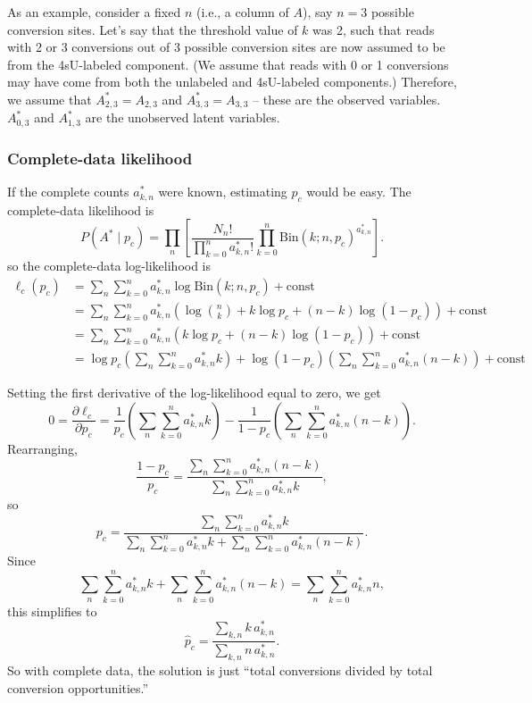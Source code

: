 \documentclass[11pt]{article}
\begin{document}
As an example, consider a fixed $n$ (i.e., a column of $A$), say $n = 3$ possible conversion sites. Let's say that the threshold value of $k$ was 2, such that reads with 2 or 3 conversions out of 3 possible conversion sites are now assumed to be from the 4sU-labeled component. (We assume that reads with 0 or 1 conversions may have come from both the unlabeled and 4sU-labeled components.) Therefore, we assume that $A^*_{2,3} = A_{2,3}$ and $A^*_{3,3} = A_{3,3}$ -- these are the observed variables. $A^*_{0, 3}$ and $A^*_{1,3}$ are the unobserved latent variables.

\subsubsection{Complete-data likelihood}

If the complete counts $a^*_{k,n}$ were known, estimating $p_c$ would be easy. The complete-data likelihood is
\[
P(A^* \mid p_c)
=
\prod_n
\left[
\frac{N_n!}{\prod_{k=0}^n a^*_{k,n}!}
\prod_{k=0}^n \mathrm{Bin}(k;n,p_c)^{a^*_{k,n}}
\right].
\]
so the complete-data log-likelihood is
\[
\begin{aligned}
\ell_c(p_c)
&=
\sum_n\sum_{k=0}^n a^*_{k,n}\log \mathrm{Bin}(k;n,p_c)+\text{const} \\
&= \sum_n\sum_{k=0}^n a^*_{k,n} \left(\log\binom{n}{k}+k\log p_c +(n-k)\log(1-p_c) \right) + \text{const} \\
&= \sum_n\sum_{k=0}^n a^*_{k,n} \left(k\log p_c +(n-k)\log(1-p_c) \right) + \text{const} \\
&= \log p_c \left(\sum_n \sum_{k=0}^n a^*_{k,n} k \right) + \log(1-p_c) \left( \sum_n\sum_{k=0}^n a^*_{k,n} (n-k) \right) + \text{const} 
\end{aligned}
\]

Setting the first derivative of the log-likelihood equal to zero, we get
\[
0
= \frac{\partial \ell_c}{\partial p_c}
= \frac{1}{p_c} \left(\sum_n \sum_{k=0}^n a^*_{k,n} k \right)
- \frac{1}{1-p_c} \left( \sum_n\sum_{k=0}^n a^*_{k,n} (n-k) \right).
\]
Rearranging,
\[
\frac{1-p_c}{p_c}
=
\frac{\sum_n\sum_{k=0}^n a^*_{k,n}(n-k)}{\sum_n\sum_{k=0}^n a^*_{k,n}k},
\]
so
\[
p_c
=
\frac{\sum_n\sum_{k=0}^n a^*_{k,n}k}{\sum_n\sum_{k=0}^n a^*_{k,n}k + \sum_n\sum_{k=0}^n a^*_{k,n}(n-k)}.
\]
Since
\[
\sum_n\sum_{k=0}^n a^*_{k,n}k + \sum_n\sum_{k=0}^n a^*_{k,n}(n-k)
=
\sum_n\sum_{k=0}^n a^*_{k,n}n,
\]
this simplifies to
\[
\widehat p_c
=
\frac{\sum_{k,n} k\,a^*_{k,n}}{\sum_{k,n} n\,a^*_{k,n}}.
\]
So with complete data, the solution is just ``total conversions divided by total conversion opportunities.''
\end{document}
